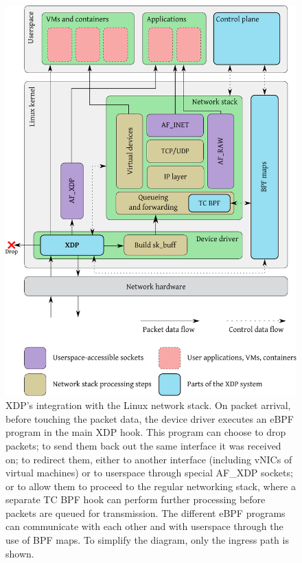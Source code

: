 \documentclass[sigconf]{acmart}
\begin{document}
\begin{figure}[t]
\centering
\includegraphics[width=\linewidth]{figures/kernel-diagram.pdf}
\caption{\label{fig:xdp-kernel} XDP's integration with the Linux network stack.
  On packet arrival, before touching the packet data, the device driver executes
  an eBPF program in the main XDP hook. This program can choose to drop packets;
  to send them back out the same interface it was received on; to redirect them,
  either to another interface (including vNICs of virtual machines) or to
  userspace through special AF\_XDP sockets; or to allow them to proceed to the
  regular networking stack, where a separate TC BPF hook can perform further
  processing before packets are queued for transmission. The different eBPF
  programs can communicate with each other and with userspace through the use of
  BPF maps. To simplify the diagram, only the ingress path is shown.}
\end{figure}
\end{document}
